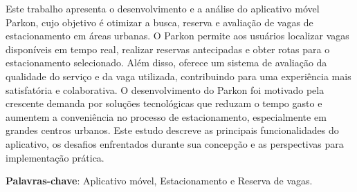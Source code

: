 

\begin{resumo}

Este trabalho apresenta o desenvolvimento e a análise do aplicativo móvel Parkon, cujo objetivo é otimizar a busca, reserva e avaliação de vagas de estacionamento em áreas urbanas. O Parkon permite aos usuários localizar vagas disponíveis em tempo real, realizar reservas antecipadas e obter rotas para o estacionamento selecionado. Além disso, oferece um sistema de avaliação da qualidade do serviço e da vaga utilizada, contribuindo para uma experiência mais satisfatória e colaborativa. O desenvolvimento do Parkon foi motivado pela crescente demanda por soluções tecnológicas que reduzam o tempo gasto e aumentem a conveniência no processo de estacionamento, especialmente em grandes centros urbanos. Este estudo descreve as principais funcionalidades do aplicativo, os desafios enfrentados durante sua concepção e as perspectivas para implementação prática.

{\hspace{-8mm} \bf{Palavras-chave}}: Aplicativo móvel, Estacionamento e Reserva de vagas.

\end{resumo}

